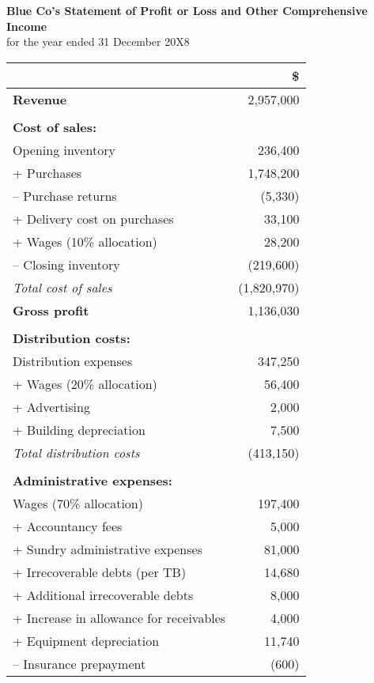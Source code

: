 




\begin{center}
\textbf{Blue Co's Statement of Profit or Loss and Other Comprehensive Income} \\
for the year ended 31 December 20X8

\begin{tabular}{@{}l r@{}}
\toprule
 & \textbf{\$} \\
\midrule
\textbf{Revenue} & 2,957,000 \\
\\[-6pt]
\textbf{Cost of sales:} & \\
\quad Opening inventory & 236,400 \\
\quad + Purchases & 1,748,200 \\
\quad -- Purchase returns & (5,330) \\
\quad + Delivery cost on purchases & 33,100 \\
\quad + Wages (10\% allocation) & 28,200 \\
\quad -- Closing inventory & (219,600) \\
\quad \textit{Total cost of sales} & (1,820,970) \\
\textbf{Gross profit} & 1,136,030 \\
\\[-6pt]
\textbf{Distribution costs:} & \\
\quad Distribution expenses & 347,250 \\
\quad + Wages (20\% allocation) & 56,400 \\
\quad + Advertising & 2,000 \\
\quad + Building depreciation & 7,500 \\
\quad \textit{Total distribution costs} & (413,150) \\
\\[-6pt]
\textbf{Administrative expenses:} & \\
\quad Wages (70\% allocation) & 197,400 \\
\quad + Accountancy fees & 5,000 \\
\quad + Sundry administrative expenses & 81,000 \\
\quad + Irrecoverable debts (per TB) & 14,680 \\
\quad + Additional irrecoverable debts & 8,000 \\
\quad + Increase in allowance for receivables & 4,000 \\
\quad + Equipment depreciation & 11,740 \\
\quad -- Insurance prepayment & (600) \\

\end{tabular}
\end{center}
